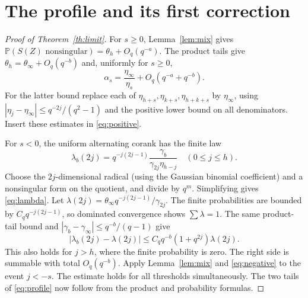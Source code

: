 \documentclass[11pt]{article}
\newcommand{\Prob}{\mathbb P}
\begin{document}
\section{The profile and its first correction}

\begin{proof}[Proof of Theorem~\ref{th:limit}]
For $s\ge0$, Lemma~\ref{lem:mix} gives $\Prob(S(Z)\text{ nonsingular})=\theta_h+O_q(q^{-a})$. The product tails give $\theta_h=\theta_\infty+O_q(q^{-b})$ and, uniformly for $s\ge0$,
\[
 \alpha_s=\frac{\eta_\infty}{\eta_s}+O_q(q^{-a}+q^{-b}).
\]
For the latter bound replace each of $\eta_{h+s},\eta_{k+s},\eta_{h+k+s}$ by $\eta_\infty$, using $|\eta_j-\eta_\infty|\le q^{-2j}/(q^2-1)$ and the positive lower bound on all denominators. Insert these estimates in \eqref{eq:positive}.

For $s<0$, the uniform alternating corank has the finite law
\begin{equation}
 \lambda_b(2j)=q^{-j(2j-1)}\frac{\gamma_b}{\gamma_{2j}\eta_{h-j}}
 \quad(0\le j\le h).
 \label{eq:lambda}
\end{equation}
Choose the $2j$-dimensional radical (using the Gaussian binomial coefficient) and a nonsingular form on the quotient, and divide by $q^m$. Simplifying gives \eqref{eq:lambda}. Let $\lambda(2j)=\theta_\infty q^{-j(2j-1)}/\gamma_{2j}$. The finite probabilities are bounded by $C_q q^{-j(2j-1)}$, so dominated convergence shows $\sum\lambda=1$. The same product-tail bound and $|\gamma_b-\gamma_\infty|\le q^{-b}/(q-1)$ give
\[
 |\lambda_b(2j)-\lambda(2j)|\le C_q q^{-b}(1+q^{2j})\lambda(2j).
\]
This also holds for $j>h$, where the finite probability is zero. The right side is summable with total $O_q(q^{-b})$. Apply Lemma~\ref{lem:mix} and \eqref{eq:negative} to the event $j<-s$. The estimate holds for all thresholds simultaneously. The two tails of \eqref{eq:profile} now follow from the product and probability formulas.
\end{proof}
\end{document}
